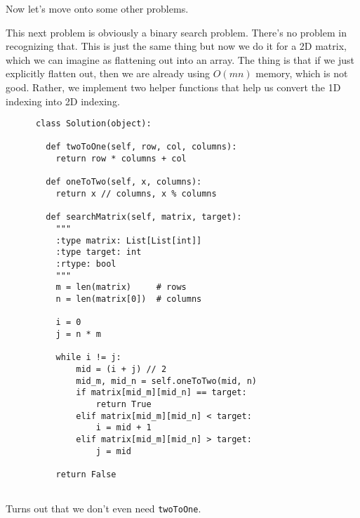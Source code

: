 \documentclass{article}
\begin{document}
  Now let's move onto some other problems. 

  \begin{example}

    This next problem is obviously a binary search problem. There's no problem in recognizing that. This is just the same thing but now we do it for a 2D matrix, which we can imagine as flattening out into an array. The thing is that if we just explicitly flatten out, then we are already using $O(mn)$ memory, which is not good. Rather, we implement two helper functions that help us convert the 1D indexing into 2D indexing. 
    \begin{lstlisting}
      class Solution(object):

        def twoToOne(self, row, col, columns): 
          return row * columns + col

        def oneToTwo(self, x, columns): 
          return x // columns, x % columns

        def searchMatrix(self, matrix, target):
          """
          :type matrix: List[List[int]]
          :type target: int
          :rtype: bool
          """
          m = len(matrix)     # rows
          n = len(matrix[0])  # columns 

          i = 0
          j = n * m 

          while i != j: 
              mid = (i + j) // 2 
              mid_m, mid_n = self.oneToTwo(mid, n) 
              if matrix[mid_m][mid_n] == target: 
                  return True 
              elif matrix[mid_m][mid_n] < target: 
                  i = mid + 1 
              elif matrix[mid_m][mid_n] > target: 
                  j = mid 
          
          return False
          
      \end{lstlisting}

      Turns out that we don't even need \texttt{twoToOne}. 
  \end{example}
\end{document}

